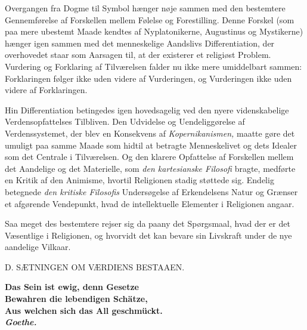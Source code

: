\documentclass[12pt,a4paper,openany]{book}
\newcommand{\opage}[1]{\marginnote{\footnotesize\textit{[#1]}}}
\begin{document}
Overgangen fra Dogme til Symbol hænger nøje sammen med den bestemtere
Gennemførelse af Forskellen mellem Følelse og Forestilling. Denne
Forskel (som paa mere ubestemt Maade kendtes af Nyplatonikerne,
Augustinus og Mystikerne) hænger igen sammen med det menneskelige
Aandslivs Differentiation, der overhovedet staar som Aarsagen til, at
der existerer et religiøst Problem. Vurdering og Forklaring af
Tilværelsen falder nu ikke mere umiddelbart sammen: Forklaringen følger
ikke uden videre af Vurderingen, og Vurderingen ikke uden videre af
Forklaringen.

Hin Differentiation betingedes igen hovedsagelig ved den nyere
videnskabelige Verdensopfattelses Tilbliven. Den Udvidelse og
Uendeliggørelse af Verdenssystemet, der blev en Konsekvens af
\textit{Kopernikanismen,} maatte gøre det umuligt paa samme Maade som
hidtil at betragte Menneskelivet og dets Idealer som det Centrale i
Tilværelsen. Og den klarere Opfattelse af Forskellen mellem det
Aandelige og det Materielle, som \textit{den kartesianske Filosofi}
bragte, medførte en Kritik af den Animisme, hvortil Religionen stadig
støttede sig. Endelig betegnede \textit{den kritiske Filosofis}
Undersøgelse af Erkendelsens Natur og Grænser et afgørende Vendepunkt,
hvad de intellektuelle Elementer i Religionen angaar.

Saa meget des bestemtere rejser sig da paany det Spørgsmaal, hvad der er
det Væsentlige i Religionen, og hvorvidt det kan bevare sin Livskraft
under de nye aandelige Vilkaar.

\clearpage

\opage{145}\begin{center}D. SÆTNINGEN OM VÆRDIENS BESTAAEN.\end{center}

\begin{flushright}\begin{minipage}{0.55\textwidth}\small\bfseries
Das Sein ist ewig, denn Gesetze\\
Bewahren die lebendigen Schätze,\\
Aus welchen sich das All geschmückt.\\
\hfill\textit{Goethe.}
\end{minipage}\end{flushright}
\end{document}
